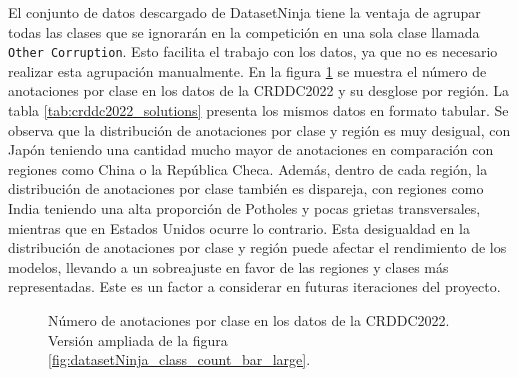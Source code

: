 El conjunto de datos descargado de DatasetNinja tiene la ventaja de agrupar todas las clases que se ignorarán en la competición en una sola clase llamada \texttt{Other Corruption}. Esto facilita el trabajo con los datos, ya que no es necesario realizar esta agrupación manualmente. En la figura \ref{fig:datasetNinja_class_count_bar} se muestra el número de anotaciones por clase en los datos de la CRDDC2022 y su desglose por región. La tabla \ref{tab:crddc2022_solutions} presenta los mismos datos en formato tabular. Se observa que la distribución de anotaciones por clase y región es muy desigual, con Japón teniendo una cantidad mucho mayor de anotaciones en comparación con regiones como China o la República Checa. Además, dentro de cada región, la distribución de anotaciones por clase también es dispareja, con regiones como India teniendo una alta proporción de Potholes y pocas grietas transversales, mientras que en Estados Unidos ocurre lo contrario. Esta desigualdad en la distribución de anotaciones por clase y región puede afectar el rendimiento de los modelos, llevando a un sobreajuste en favor de las regiones y clases más representadas. Este es un factor a considerar en futuras iteraciones del proyecto.

\begin{figure}[H]
    \centering
    \caption{Número de anotaciones por clase en los datos de la CRDDC2022. Versión ampliada de la figura \ref{fig:datasetNinja_class_count_bar_large}.}
    \label{fig:datasetNinja_class_count_bar}
\end{figure}

